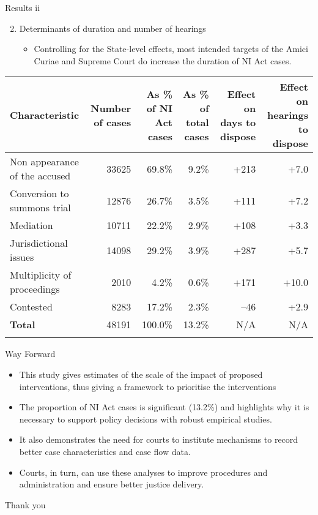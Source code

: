 \documentclass[10pt,aspectratio=169]{beamer}
\begin{document}
\begin{frame}{Results ii}

\begin{enumerate}
 \setcounter{enumi}{1}
 \item Determinants of duration and number of hearings
 \begin{itemize}
 \item Controlling for the State-level effects, most intended targets of the Amici Curiae and Supreme Court do increase the duration of NI Act cases.
 \end{itemize}
\end{enumerate}

{\scriptsize \begin{longtable}{@{}p{2.5cm}rrrrr}
 \toprule
 \textbf{Characteristic} & \multicolumn{1}{p{1.7cm}}{\textbf{Number of cases}} &
 \multicolumn{1}{p{1.7cm}}{\textbf{As \% of NI Act cases}}
 & \multicolumn{1}{p{1.7cm}}{\textbf{As \% of total cases}}
 & \multicolumn{1}{p{1.7cm}}{\textbf{Effect on days to dispose}} &
 \multicolumn{1}{p{1.7cm}}{\textbf{Effect on hearings to dispose}}
 \\
 \midrule
 Non appearance of the accused & 33625 & 69.8\% & 9.2\% & +213 & +7.0 \\ \midrule
 Conversion to summons trial & 12876 & 26.7\% & 3.5\% & +111 & +7.2 \\ \midrule
 Mediation & 10711 & 22.2\% & 2.9\% & +108 & +3.3 \\ \midrule
 Jurisdictional issues & 14098 & 29.2\% & 3.9\% & +287 & +5.7 \\ \midrule
 Multiplicity of proceedings & 2010 & 4.2\% & 0.6\% & +171 & +10.0 \\ \midrule
 Contested & 8283 & 17.2\% & 2.3\% & --46 & +2.9 \\ \midrule
 \textbf{Total} & 48191 & 100.0\% & 13.2\% & N/A & N/A \\
 \bottomrule
 \\
\end{longtable}
}

\end{frame}

\begin{frame}{Way Forward}
 \begin{itemize}
 \item This study gives estimates of the scale of the impact of proposed interventions, thus giving a framework to prioritise the interventions
 \item The proportion of NI Act cases is significant (13.2\%) and highlights why it is necessary to support policy decisions with robust empirical studies.
 \item It also demonstrates the need for courts to institute mechanisms to record better case characteristics and case flow data. 
 \item Courts, in turn, can use these analyses to improve procedures and administration and ensure better justice delivery.
 \end{itemize}
\end{frame}

\begin{frame}
 \centering \huge{Thank you}
\end{frame}
\end{document}
